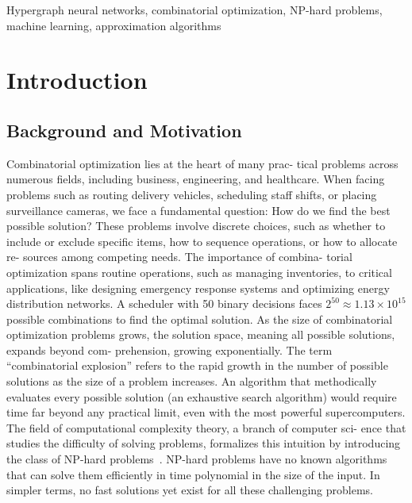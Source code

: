 \documentclass[conference]{IEEEtran}
\begin{document}
\begin{IEEEkeywords}
Hypergraph neural networks, combinatorial optimization, NP-hard problems, machine learning, approximation algorithms
\end{IEEEkeywords}

\section{Introduction}
\subsection{Background and Motivation}
Combinatorial optimization lies at the heart of many prac-
tical problems across numerous fields, including business,
engineering, and healthcare. When facing problems such as
routing delivery vehicles, scheduling staff shifts, or placing
surveillance cameras, we face a fundamental question: How
do we find the best possible solution? These problems involve
discrete choices, such as whether to include or exclude specific
items, how to sequence operations, or how to allocate re-
sources among competing needs. The importance of combina-
torial optimization spans routine operations, such as managing
inventories, to critical applications, like designing emergency
response systems and optimizing energy distribution networks.
A scheduler with 50 binary decisions faces \(2^{50} \approx 1.13 \times 10^{15}\) possible combinations to find the optimal solution. As the size
of combinatorial optimization problems grows, the solution
space, meaning all possible solutions, expands beyond com-
prehension, growing exponentially. The term “combinatorial
explosion” refers to the rapid growth in the number of possible
solutions as the size of a problem increases. An algorithm that
methodically evaluates every possible solution (an exhaustive
search algorithm) would require time far beyond any practical
limit, even with the most powerful supercomputers. The field
of computational complexity theory, a branch of computer sci-
ence that studies the difficulty of solving problems, formalizes
this intuition by introducing the class of NP-hard problems~\cite{GareyJohnson1979,Cook1971}.
NP-hard problems have no known algorithms that can solve
them efficiently in time polynomial in the size of the input.
In simpler terms, no fast solutions yet exist for all these
challenging problems.
\end{document}
